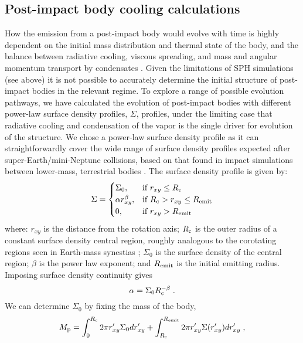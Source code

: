\documentclass[sn-nature]{sn-jnl}%
\begin{document}
\subsection*{Post-impact body cooling calculations}

How the emission from a post-impact body would evolve with time is highly dependent on the initial mass distribution and thermal state of the body, and the balance between radiative cooling, viscous spreading, and mass and angular momentum transport by condensates \cite{Lock2017,Lock2018moon,Lock2020}. 
%
Given the limitations of SPH simulations (see above) it is not possible to accurately determine the initial structure of post-impact bodies in the relevant regime.
%
To explore a range of possible evolution pathways, we have calculated the evolution of post-impact bodies with different power-law surface density profiles, $\Sigma$, profiles, under the limiting case that radiative cooling and condensation of the vapor is the single driver for evolution of the structure. 
%
We chose a power-law surface density profile as it can straightforwardly cover the wide range of surface density profiles expected after super-Earth/mini-Neptune collisions, based on that found in impact simulations between lower-mass, terrestrial bodies \cite{Lock2017,Canup2001,Canup2012,Cuk2012,Rufu2017,Reufer2012}. 
%
The surface density profile is given by:
%
\begin{equation}
\Sigma=\begin{cases}
\Sigma_0, & \text{if } r_{xy}\leq R_{\rm c}\\
\alpha r_{xy}^{\beta}, & \text{if } R_{\rm c} > r_{xy}\leq R_{\rm emit}\\
0, & \text{if } r_{xy}> R_{\rm emit}
\end{cases}   
\label{eqn:sigma}
\end{equation}
%
where: $r_{xy}$ is the distance from the rotation axis; $R_{\rm c}$ is the outer radius of a constant surface density central region, roughly analogous to the corotating regions seen in Earth-mass synestias \cite{Lock2017,Lock2018moon}; $\Sigma_0$ is the surface density of the central region; $\beta$ is the power law exponent; and $R_{\rm emit}$ is the initial emitting radius. Imposing surface density continuity gives
%
\begin{equation}
    \alpha=\Sigma_0 R_{\rm c}^{-\beta} \; .
\end{equation}
%
We can determine $\Sigma_0$ by fixing the mass of the body, 
%
\begin{equation}
    M_{\rm p} = \int_0^{R_{\rm c}}{2 \pi r'_{xy} \Sigma_0 dr'_{xy}} + \int_{R_{\rm c}}^{R_{\rm emit}}{2 \pi r'_{xy} \Sigma(r'_{xy}) dr'_{xy}} \; ,
\end{equation}
\end{document}
